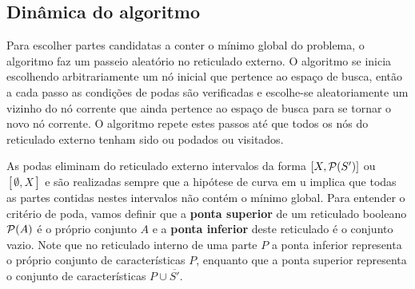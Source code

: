 \subsection{Dinâmica do algoritmo}
Para escolher partes candidatas a conter o mínimo global do problema,
o algoritmo  faz um passeio aleatório no reticulado 
externo. O algoritmo se inicia escolhendo arbitrariamente um nó inicial 
que pertence ao espaço de busca, então a cada passo as condições de podas
são verificadas e escolhe-se aleatoriamente um vizinho do nó corrente
que ainda pertence ao espaço de busca para se tornar o novo nó corrente.
O algoritmo repete estes passos até que todos os nós do reticulado 
externo tenham sido ou podados ou visitados.

As podas eliminam do reticulado externo intervalos da forma 
$[X, \mathcal{P}(S')]$ ou $[\emptyset, X]$ e são realizadas sempre que a 
hipótese de curva em u implica que todas as partes contidas nestes 
intervalos não contém o mínimo global. Para entender o critério de poda,
vamos definir que a {\bf ponta superior} de um reticulado booleano 
$\mathcal{P} (A)$ é o próprio conjunto $A$ e a {\bf ponta inferior} deste
reticulado é o conjunto vazio. Note que no reticulado interno de uma
parte $P$ a ponta inferior representa o próprio conjunto de 
características $P$, enquanto que a ponta superior representa o conjunto
de características $P \cup \overline{S'}$.

